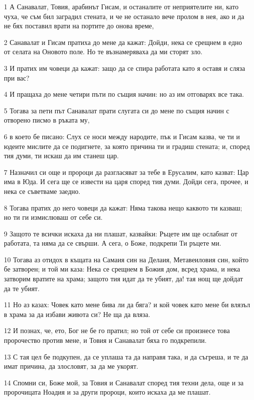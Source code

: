 \par 1 А Санавалат, Товия, арабинът Гисам, и останалите от неприятелите ни, като чуха, че съм бил заградил стената, и че не останало вече пролом в нея, ако и да не бях поставил врати на портите до онова време,
\par 2 Санавалат и Гисам пратиха до мене да кажат: Дойди, нека се срещнем в едно от селата на Оновото поле. Но те възнамеряваха да ми сторят зло.
\par 3 И пратих им човеци да кажат: защо да се спира работата като я оставя и сляза при вас?
\par 4 И пращаха до мене четири пъти по същия начин: но аз им отговарях все така.
\par 5 Тогава за пети път Санавалат прати слугата си до мене по същия начин с отворено писмо в ръката му,
\par 6 в което бе писано: Слух се носи между народите, пък и Гисам казва, че ти и юдеите мислите да се подигнете, за която причина ти и градиш стената; и, според тия думи, ти искаш да им станеш цар.
\par 7 Назначил си още и пророци да разгласяват за тебе в Ерусалим, като казват: Цар има в Юда. И сега ще се извести на царя според тия думи. Дойди сега, прочее, и нека се съветваме заедно.
\par 8 Тогава пратих до него човеци да кажат: Няма такова нещо каквото ти казваш; но ти ги измислюваш от себе си.
\par 9 Защото те всички искаха да ни плашат, казвайки: Ръцете им ще ослабнат от работата, та няма да се свърши. А сега, о Боже, подкрепи Ти ръцете ми.
\par 10 Тогава аз отидох в къщата на Самаия син на Делаия, Метавеиловия син, който бе затворен; и той ми каза: Нека се срещнем в Божия дом, всред храма, и нека затворим вратите на храма; защото тия идат да те убият, да! тая нощ ще дойдат да те убият.
\par 11 Но аз казах: Човек като мене бива ли да бяга? и кой човек като мене би влязъл в храма за да избави живота си? Не ща да вляза.
\par 12 И познах, че, ето, Бог не бе го пратил; но той от себе си произнесе това пророчество против мене, и Товия и Санавалат бяха го подкрепили.
\par 13 С тая цел бе подкупен, да се уплаша та да направя така, и да съгреша, и те да имат причина, да злословят, за да ме укорят.
\par 14 Спомни си, Боже мой, за Товия и Санавалат според тия техни дела, още и за пророчицата Ноадия и за други пророци, които искаха да ме плашат.
